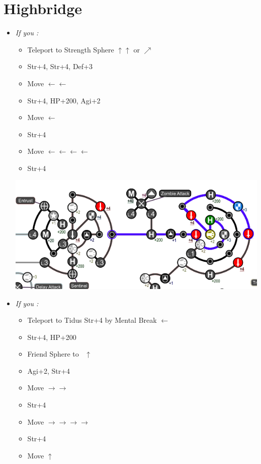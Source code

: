 \chapter{Highbridge}
\begin{spheregrid}
	\begin{itemize}
		\yunaf
		\item \textit{If you \wonblitz:}
		      \begin{itemize}
			      \item Teleport to Strength Sphere $\uparrow\uparrow$ or $\nearrow$
			      \item Str+4, Str+4, Def+3
			      \item Move $\leftarrow\leftarrow$
			      \item Str+4, HP+200, Agi+2
			      \item Move $\leftarrow$
			      \item Str+4
			      \item Move $\leftarrow\leftarrow\leftarrow\leftarrow$
			      \item Str+4
		      \end{itemize}
		      \includegraphics[width=.9\columnwidth]{graphics/Yuna_blitz_WIN_highroad}
		\item \textit{If you \lostblitz:}
		      \begin{itemize}
			      \item Teleport to Tidus Str+4 by Mental Break $\leftarrow$
			      \item Str+4, HP+200
			      \item Friend Sphere to \tidus\ $\uparrow$
			      \item Agi+2, Str+4
			      \item Move $\rightarrow\rightarrow$
			      \item Str+4
			      \item Move $\rightarrow\rightarrow\rightarrow\rightarrow$
			      \item Str+4
			      \item Move $\uparrow$

\end{itemize}
\end{itemize}
\end{spheregrid}
